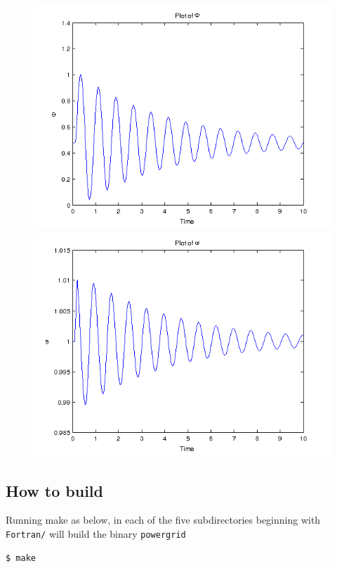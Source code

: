 \clearpage
\begin{figure}[h]
\centering
\includegraphics[width=1.2\linewidth]{../Code/miniApps/power_grid/phi_fortran_da_tap.png}
\label{fig:phi_fortran_da_tap}
\includegraphics[width=1.2\linewidth]{../Code/miniApps/power_grid/omega_fortran_da_tap.png}
\label{fig:omega_fortran_da_tap}
\end{figure}
\clearpage
\subsection{How to build}
Running make as below, in each of the five subdirectories beginning with \texttt{Fortran/} will build the  binary \texttt{powergrid}
\hfill\break
\begin{lstlisting}[language=mybash, numbers=none]
    $ make
\end{lstlisting}
